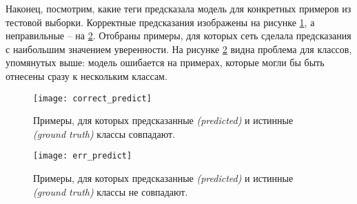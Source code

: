 \indent
\indent
Наконец, посмотрим, какие теги предсказала модель для конкретных
примеров из тестовой выборки. Корректные предсказания изображены
на рисунке \ref{tikzpicture: correct_predict}, а неправильные -- на
\ref{tikzpicture: err_predict}. Отобраны примеры, для которых сеть сделала
предсказания с наибольшим значением уверенности.
На рисунке \ref{tikzpicture: err_predict} видна
проблема для классов, упомянутых выше: модель ошибается на примерах, 
которые могли бы быть отнесены сразу к нескольким классам.


\begin{figure}
    \begin{center}
   	    \texttt{[image: correct\_predict]}
   	\end{center}
   	\caption{Примеры, для которых предсказанные
   	 \textit{(predicted)} и истинные \textit{(ground truth)} классы совпадают.}
   	\label{tikzpicture: correct_predict}
\end{figure}


\begin{figure}
    \begin{center}
   	    \texttt{[image: err\_predict]}
   	\end{center}
   	\caption{Примеры, для которых предсказанные
   	 \textit{(predicted)} и истинные \textit{(ground truth)} классы не совпадают.}
   	\label{tikzpicture: err_predict}
\end{figure}
